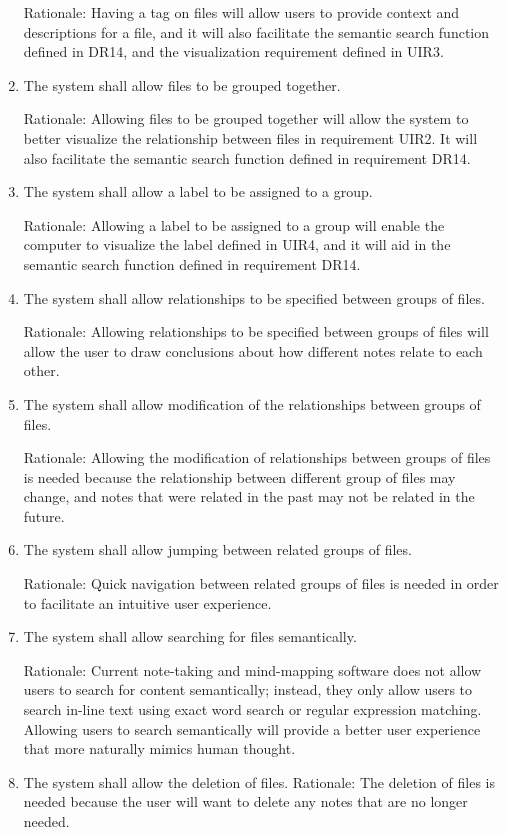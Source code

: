 \documentclass{article}
\begin{document}
\begin{enumerate}[DR1]
Rationale: Having a tag on files will allow users to provide context and descriptions for a file, and it will also facilitate the semantic search function defined in DR14, and the visualization requirement defined in UIR3.
\item The system shall allow files to be grouped together.

Rationale: Allowing files to be grouped together will allow the system to better visualize the relationship between files in requirement UIR2. It will also facilitate the semantic search function defined in requirement DR14.
\item The system shall allow a label to be assigned to a group.

Rationale: Allowing a label to be assigned to a group will enable the computer to visualize the label defined in UIR4, and it will aid in the semantic search function defined in requirement DR14.
\item The system shall allow relationships to be specified between groups of files.

Rationale: Allowing relationships to be specified between groups of files will allow the user to draw conclusions about how different notes relate to each other.
\item The system shall allow modification of the relationships between groups of files.

Rationale: Allowing the modification of relationships between groups of files is needed because the relationship between different group of files may change, and notes that were related in the past may not be related in the future.
\item The system shall allow jumping between related groups of files.

Rationale: Quick navigation between related groups of files is needed in order to facilitate an intuitive user experience.
\item The system shall allow searching for files semantically.

Rationale: Current note-taking and mind-mapping software does not allow users to search for content semantically; instead, they only allow users to search in-line text using exact word search or regular expression matching. Allowing users to search semantically will provide a better user experience that more naturally mimics human thought.
\item The system shall allow the deletion of files.
Rationale: The deletion of files is needed because the user will want to delete any notes that are no longer needed.
\end{enumerate}
\end{document}
